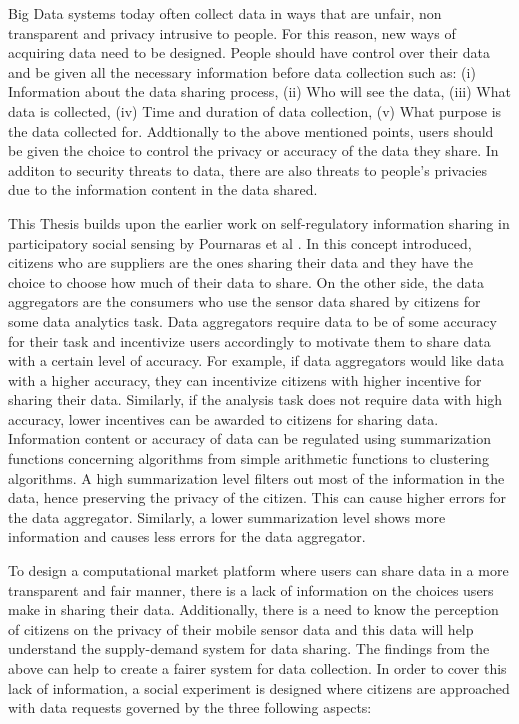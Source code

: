 Big Data systems today often collect data in ways that are unfair, non transparent and privacy intrusive to people. For this reason, new ways of acquiring data need to be designed. People should have control over their data and be given all the necessary information before data collection such as: (i) Information about the data sharing process, (ii) Who will see the data, (iii) What data is collected, (iv) Time and duration of data collection, (v) What purpose is the data collected for. Addtionally to the above mentioned points, users should be given the choice to control the privacy or accuracy of the data they share. In additon to security threats to data, there are also threats to people's privacies due to the information content in the data shared. 

This Thesis builds upon the earlier work on self-regulatory information sharing in participatory social sensing by Pournaras et al \cite{pournaras2016self}. In this concept introduced, citizens who are suppliers are the ones sharing their data and they have the choice to choose how much of their data to share. On the other side, the data aggregators are the consumers who use the sensor data shared by citizens for some data analytics task. Data aggregators require data to be of some accuracy for their task and incentivize users accordingly to motivate them to share data with a certain level of accuracy. For example, if data aggregators would like data with a higher accuracy, they can incentivize citizens with higher incentive for sharing their data. Similarly, if the analysis task does not require data with high accuracy, lower incentives can be awarded to citizens for sharing data. Information content or accuracy of data can be regulated using summarization functions concerning algorithms from simple arithmetic functions to clustering algorithms. A high summarization level filters out most of the information in the data, hence preserving the privacy of the citizen. This can cause higher errors for the data aggregator. Similarly, a lower summarization level shows more information and causes less errors for the data aggregator.

To design a computational market platform where users can share data in a more transparent and fair manner, there is a lack of information on the choices users make in sharing their data. Additionally, there is a need to know the perception of citizens on the privacy of their mobile sensor data and this data will help understand the supply-demand system for data sharing. The findings from the above can help to create a fairer system for data collection. In order to cover this lack of information, a social experiment is designed where citizens are approached with data requests governed by the three following aspects:

